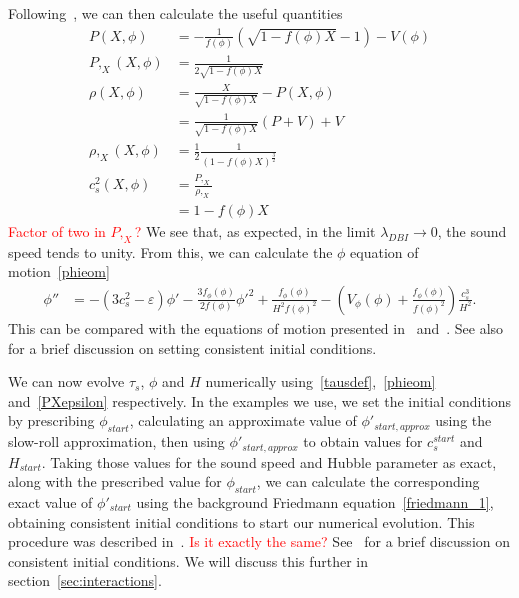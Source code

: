     Following~\cite{Christopherson_2009, mukhanov_1999},
    we can then calculate the useful quantities
    \begin{align}
        P(X, \phi) &= -\frac{1}{f(\phi)}\left(\sqrt{1-f(\phi)X}-1\right)-V(\phi)\\
        P,_X(X, \phi) &= \frac{1}{2\sqrt{1-f(\phi)X}}\\
        \rho(X, \phi) &= \frac{X}{\sqrt{1-f(\phi)X}}-P(X,\phi)\\
                    &= \frac{1}{\sqrt{1-f(\phi)X}}(P+V)+V\\
        \rho,_X(X, \phi) &= \frac{1}{2}\frac{1}{\left(1-f(\phi)X\right)^{\frac{3}{2}}}\\
        c^2_s(X, \phi) &= \frac{P,_X}{\rho,_X}\\
                    &= 1-f(\phi)X
    \end{align}
    \textcolor{red}{Factor of two in $P,_X$?}
    We see that, as expected, in the limit $\lambda_{DBI}\rightarrow 0$, the sound
    speed tends to unity.
    From this, we can calculate the $\phi$ equation of motion~\eqref{phieom}
    \begin{align}
        \phi'' &= -(3c_s^2-\varepsilon)\phi'
                -\frac{3f_\phi(\phi)}{2f(\phi)}\phi'^2
                +\frac{f_\phi(\phi)}{H^2f(\phi)^2}
                -\left(V_\phi(\phi)+\frac{f_\phi(\phi)}{f(\phi)^2}\right)\frac{c_s^3}{H^2}.
    \end{align}
    This can be compared with the equations of motion presented in~\cite{dbi_silverstein}
    and~\cite{warp_features_dbi}.
    See also~\cite{cmb_pol_ics} for a brief discussion on setting consistent initial conditions.


    We can now evolve $\tau_s$, $\phi$ and $H$ numerically
    using~\eqref{tausdef},~\eqref{phieom} and~\eqref{PXepsilon} respectively.
    In the examples we use, we set the initial conditions by prescribing $\phi_{start}$,
    calculating an approximate value of $\phi'_{start, approx}$ using the slow-roll approximation,
    then using $\phi'_{start, approx}$ to obtain values for $c^{start}_s$ and $H_{start}$.
    Taking those values for the sound speed and Hubble parameter as exact, along with the
    prescribed value for $\phi_{start}$, we can calculate the corresponding exact value
    of $\phi'_{start}$ using the background Friedmann equation~\eqref{friedmann_1},
    obtaining consistent initial conditions to start our numerical evolution.
    This procedure was described in~\cite{warp_features_dbi}.
    \textcolor{red}{Is it exactly the same?}
    See~\cite{cmb_pol_ics} for a brief discussion on consistent initial conditions.
    We will discuss this further in section~\ref{sec:interactions}.


